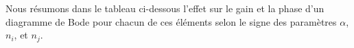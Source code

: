 Nous résumons dans le tableau ci-dessous l'effet sur le gain et la phase d'un 
diagramme de Bode pour chacun de ces éléments selon le signe des paramètres
$\alpha$, $n_i$, et $n_j$.
\newline
\newline
\begin{center}
{\tikzset{external/export=false}

}
\end{center}
\clearpage
\begin{center}
{\tikzset{external/export=false}

}
\end{center}
